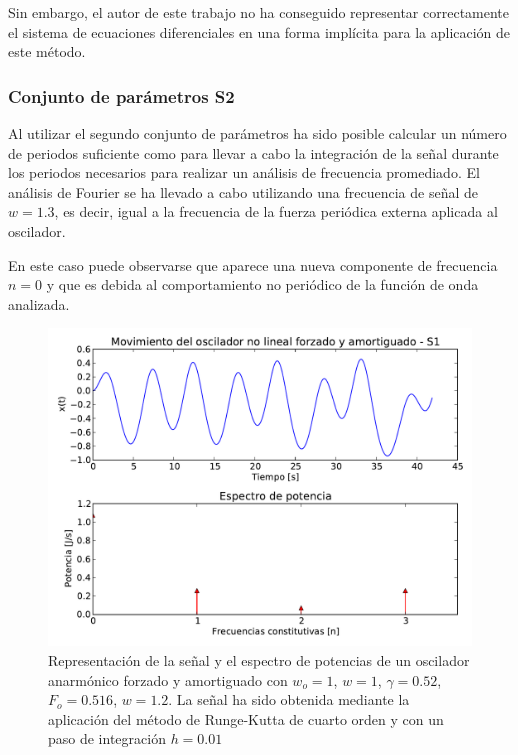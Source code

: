 \documentclass[11pt]{article}
\begin{document}
Sin embargo, el autor de este trabajo no ha conseguido representar correctamente
el sistema de ecuaciones diferenciales en una forma implícita para la aplicación
de este método.

\subsubsection{Conjunto de parámetros S2}
Al utilizar el segundo conjunto de parámetros ha sido posible calcular un número
de periodos suficiente como para llevar a cabo la integración de la señal
durante los periodos necesarios para realizar un análisis de frecuencia
promediado. El análisis de Fourier se ha llevado a cabo utilizando una
frecuencia de señal de $w=1.3$, es decir, igual a la frecuencia de la fuerza
periódica externa aplicada al oscilador.

En este caso puede observarse que aparece una nueva componente de frecuencia
$n=0$ y que es debida al comportamiento no periódico de la función de onda
analizada.

\begin{figure}
\centering
\includegraphics[width=0.75\linewidth]{caso_anarmonico_s1.pdf}
\caption{Representación de la señal y el espectro de potencias de un oscilador
anarmónico forzado y amortiguado con $w_o = 1$, $w = 1$, $\gamma = 0.52$,
$F_o = 0.516$, $w = 1.2$. La señal ha sido obtenida mediante la aplicación del
método de Runge-Kutta de cuarto orden y con un paso de integración $h = 0.01$}
\label{fig:caso_anarmonico_s1}
\end{figure}
\end{document}

